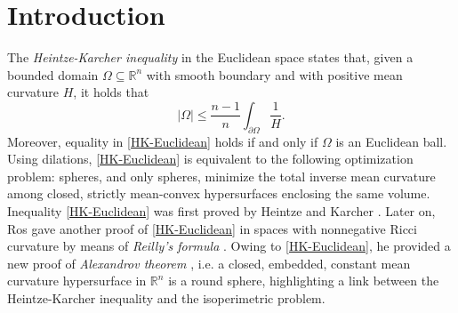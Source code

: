 \documentclass[11pt]{amsart}
\renewcommand{\leq}{\leqslant}
\renewcommand{\geq}{\geqslant}
\newcommand{\ptl}{\partial}
\newcommand{\rb}{\partial^* E}
\newcommand{\dmc}{\mathrm{H}(E,\Om)}
\newcommand{\rr}{{\mathbb{R}}}
\newcommand{\Om}{\Omega}
\DeclareMathOperator{\dive}{div_{\partial E}}
\theoremstyle{definition}
\newtheorem{remark}[theorem]{Remark}
\theoremstyle{remark}
\numberwithin{equation}{section}
\begin{document}

	
	
	
	
	
	\section{Introduction}
	
	The \emph{Heintze-Karcher inequality} in the Euclidean space states that, given a bounded domain $\Om\subseteq\rr^{n}$ with smooth boundary and with positive mean curvature $H$, it holds that
	\begin{equation}\label{HK-Euclidean}
		|\Om|\leq \frac{n-1}{n}\int_{\ptl\Om}\frac{1}{H}.
	\end{equation}
	Moreover, equality in \eqref{HK-Euclidean} holds if and only if $\Om$ is an Euclidean ball. Using dilations, \eqref{HK-Euclidean} is equivalent to the following optimization problem: spheres, and only spheres, minimize the total inverse mean curvature among closed, strictly mean-convex hypersurfaces enclosing the same volume. Inequality \eqref{HK-Euclidean} was first proved by Heintze and Karcher \cite{MR533065}. Later on, Ros \cite{MR996826} gave another proof of \eqref{HK-Euclidean} in spaces with nonnegative Ricci curvature by means of \emph{Reilly's formula} \cite{MR474149}. Owing to \eqref{HK-Euclidean}, he provided a new proof of \emph{Alexandrov theorem} \cite{MR86338,MR102114}, i.e. a closed, embedded, constant mean curvature hypersurface in $\rr^n$ is a round sphere, highlighting a link between the Heintze-Karcher inequality and the isoperimetric problem.\\
	
\end{document}
